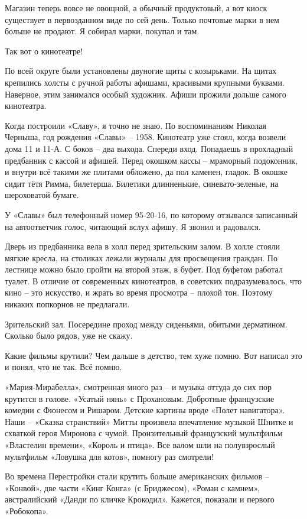 Магазин теперь вовсе не овощной, а обычный продуктовый, а вот киоск существует в первозданном виде по сей день. Только почтовые марки в нем больше не продают. Я собирал марки, покупал и там.

Так вот о кинотеатре!

По всей округе были установлены двуногие щиты с козырьками. На щитах крепились холсты с ручной работы афишами, красивыми крупными буквами. Наверное, этим занимался особый художник. Афиши прожили дольше самого кинотеатра.

Когда построили «Славу», я точно не знаю. По воспоминаниям Николая Черныша, год рождения «Славы» – 1958. Кинотеатр уже стоял, когда возвели дома 11 и 11-А. С боков – два выхода. Спереди вход. Попадаешь в прохладный предбанник с кассой и афишей. Перед окошком кассы – мраморный подоконник, и внутри всё такими же плитами обложено, да пол каменен, гладок. В окошке сидит тётя Римма, билетерша. Билетики длинненькие, синевато-зеленые, на шероховатой бумаге.

У «Славы» был телефонный номер 95-20-16, по которому отзывался записанный на автоответчик голос, читающий вслух афишу. Я звонил и радовался.

Дверь из предбанника вела в холл перед зрительским залом. В холле стояли мягкие кресла, на столиках лежали журналы для просвещения граждан. По лестнице можно было пройти на второй этаж, в буфет. Под буфетом работал туалет. В отличие от современных кинотеатров, в советских подразумевалось, что кино – это искусство, и жрать во время просмотра – плохой тон. Поэтому никаких попкорнов не предлагали.

Зрительский зал. Посередине проход между сиденьями, обитыми дерматином. Сколько было рядов, уже не скажу.

Какие фильмы крутили? Чем дальше в детство, тем хуже помню. Вот написал это и понял, что не так. Всё помню.

«Мария-Мирабелла», смотренная много раз – и музыка оттуда до сих пор крутится в голове. «Усатый нянь» с Прохановым. Добротные французские комедии с Фюнесом и Ришаром. Детские картины вроде «Полет навигатора». Наши – «Сказка странствий» Митты произвела впечатление музыкой Шнитке и схваткой героя Миронова с чумой. Пронзительный французский мультфильм «Властелин времени», «Король и птица». Все валом шли на полувзрослый мультфильм «Ловушка для котов», помногу раз смотрели!

Во времена Перестройки стали крутить больше американских фильмов – «Конвой», две части «Кинг Конга» (с Бриджесом), «Роман с камнем», австралийский «Данди по кличке Крокодил». Кажется, показали и первого «Робокопа».

